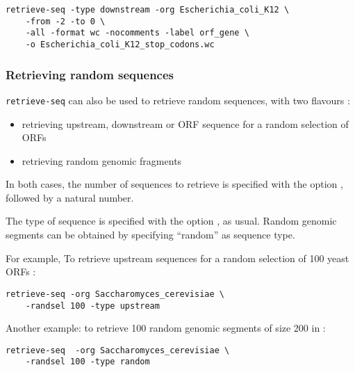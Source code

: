 \begin{verbatim}
retrieve-seq -type downstream -org Escherichia_coli_K12 \
    -from -2 -to 0 \
    -all -format wc -nocomments -label orf_gene \
    -o Escherichia_coli_K12_stop_codons.wc
\end{verbatim}

\subsubsection{Retrieving random sequences}

\texttt{retrieve-seq} can also be used to retrieve random sequences,
with two flavours :

\begin{itemize}
\item retrieving upstream, downstream or ORF sequence for a random
selection of ORFs
\item retrieving random genomic fragments
\end{itemize}

In both cases, the number of sequences to retrieve is specified with
the option , followed by a natural number.

The type of sequence is specified with the option \option{-type}, as
usual. Random genomic segments can be obtained by specifying
``random'' as sequence type.

For example, To retrieve upstream sequences for a random selection of
100 yeast ORFs :
\begin{verbatim}
retrieve-seq -org Saccharomyces_cerevisiae \
    -randsel 100 -type upstream
\end{verbatim}

Another example: to retrieve 100 random genomic segments of size 200
in  :
\begin{verbatim}
retrieve-seq  -org Saccharomyces_cerevisiae \
    -randsel 100 -type random
\end{verbatim}


